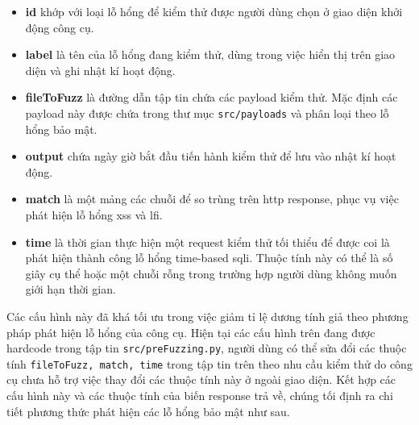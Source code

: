 \begin{itemize}
    \item \textbf{id} khớp với loại lỗ hổng để kiểm thử được người dùng chọn ở giao diện khởi động công cụ.
    \item \textbf{label} là tên của lỗ hổng đang kiểm thử, dùng trong việc hiển thị trên giao diện và ghi nhật kí hoạt động.
    \item \textbf{fileToFuzz} là đường dẫn tập tin chứa các payload kiểm thử. Mặc định các payload này được chứa trong thư mục \texttt{src/payloads} và phân loại theo lỗ hổng bảo mật.
    \item \textbf{output} chứa ngày giờ bắt đầu tiến hành kiểm thử để lưu vào nhật kí hoạt động.
    \item \textbf{match} là một mảng các chuỗi để so trùng trên \acrshort{http} response, phục vụ việc phát hiện lỗ hổng \acrshort{xss} và \acrshort{lfi}. 
    \item \textbf{time} là thời gian thực hiện một request kiểm thử tối thiểu để được coi là phát hiện thành công lỗ hổng time-based \acrshort{sqli}. Thuộc tính này có thể là số giây cụ thể hoặc một chuỗi rỗng trong trường hợp người dùng không muốn giới hạn thời gian.
\end{itemize}
Các cấu hình này đã khá tối ưu trong việc giảm tỉ lệ dương tính giả theo phương pháp phát hiện lỗ hổng của công cụ. Hiện tại các cấu hình trên đang được hardcode trong tập tin \texttt{src/preFuzzing.py}, người dùng có thể sửa đổi các thuộc tính \texttt{fileToFuzz, match, time} trong tập tin trên theo nhu cầu kiểm thử do công cụ chưa hỗ trợ việc thay đổi các thuộc tính này ở ngoài giao diện. Kết hợp các cấu hình này và các thuộc tính của biến response trả về, chúng tối định ra chi tiết phương thức phát hiện các lỗ hổng bảo mật như sau.

